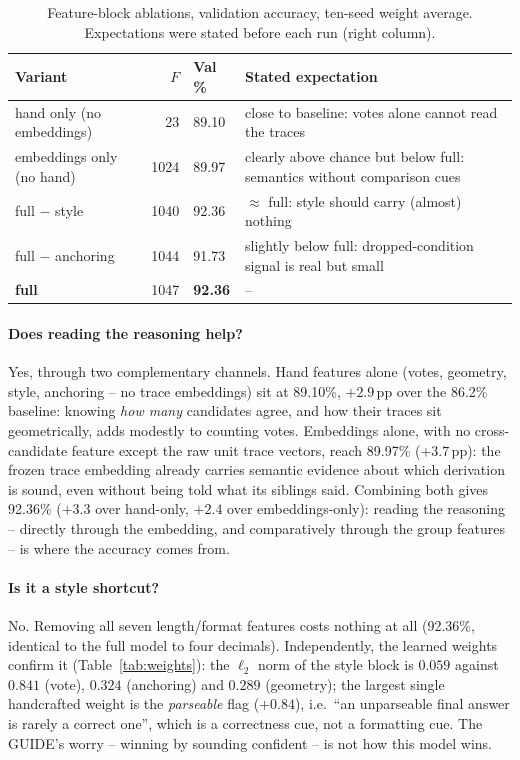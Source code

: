 \documentclass[10pt,a4paper]{article}
\newcommand{\ABHAND}{89.10}
\newcommand{\ABEMB}{89.97}
\newcommand{\ABNOSTYLE}{92.36}
\newcommand{\ABNOANCHOR}{91.73}
\begin{document}
\begin{table}[t]
\centering\small
\caption{Feature-block ablations, validation accuracy, ten-seed weight average.
Expectations were stated before each run (right column).}
\label{tab:ablations}
\begin{tabular}{lrlp{6.4cm}}
\hline
Variant & $F$ & Val\,\% & Stated expectation \\
\hline
hand only (no embeddings) & 23 & \ABHAND & close to baseline: votes alone cannot read the traces \\
embeddings only (no hand) & 1024 & \ABEMB & clearly above chance but below full: semantics without comparison cues \\
full $-$ style & 1040 & \ABNOSTYLE & $\approx$ full: style should carry (almost) nothing \\
full $-$ anchoring & 1044 & \ABNOANCHOR & slightly below full: dropped-condition signal is real but small \\
\textbf{full} & 1047 & \textbf{92.36} & -- \\
\hline
\end{tabular}
\end{table}

\paragraph{Does reading the reasoning help?} Yes, through two complementary
channels. Hand features alone (votes, geometry, style, anchoring -- no trace
embeddings) sit at \ABHAND\%, $+2.9$\,pp over the 86.2\% baseline: knowing
\emph{how many} candidates agree, and how their traces sit geometrically, adds
modestly to counting votes. Embeddings alone, with no cross-candidate feature
except the raw unit trace vectors, reach \ABEMB\% ($+3.7$\,pp): the frozen
trace embedding already carries semantic evidence about which derivation is
sound, even without being told what its siblings said. Combining both gives
92.36\% ($+3.3$ over hand-only, $+2.4$ over embeddings-only): reading the
reasoning -- directly through the embedding, and comparatively through the
group features -- is where the accuracy comes from.

\paragraph{Is it a style shortcut?} No. Removing all seven length/format
features costs nothing at all (\ABNOSTYLE\%, identical to the full model to
four decimals). Independently, the learned weights
confirm it (Table~\ref{tab:weights}): the $\ell_2$ norm of the style block is
$0.059$ against $0.841$ (vote), $0.324$ (anchoring) and $0.289$ (geometry); the
largest single handcrafted weight is the \emph{parseable} flag ($+0.84$), i.e.\
``an unparseable final answer is rarely a correct one'', which is a correctness
cue, not a formatting cue. The GUIDE's worry -- winning by sounding confident --
is not how this model wins.
\end{document}
